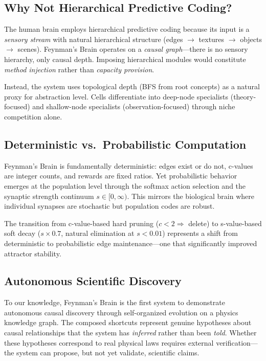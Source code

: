 \documentclass[aps,prl,reprint]{revtex4-2}
\begin{document}
\subsection{Why Not Hierarchical Predictive Coding?}

The human brain employs hierarchical predictive coding because its input is a
\emph{sensory stream} with natural hierarchical structure (edges $\rightarrow$
textures $\rightarrow$ objects $\rightarrow$ scenes). Feynman's Brain operates
on a \emph{causal graph}---there is no sensory hierarchy, only causal depth.
Imposing hierarchical modules would constitute \emph{method injection} rather
than \emph{capacity provision}.

Instead, the system uses topological depth (BFS from root concepts) as a
natural proxy for abstraction level. Cells differentiate into deep-node
specialists (theory-focused) and shallow-node specialists
(observation-focused) through niche competition alone.

\subsection{Deterministic vs.\ Probabilistic Computation}

Feynman's Brain is fundamentally deterministic: edges exist or do not, c-values
are integer counts, and rewards are fixed ratios. Yet probabilistic behavior
emerges at the population level through the softmax action selection and the
synaptic strength continuum $s \in [0, \infty)$. This mirrors the biological
brain where individual synapses are stochastic but population codes are
robust.

The transition from c-value-based hard pruning ($c < 2 \Rightarrow$ delete)
to s-value-based soft decay ($s \times 0.7$, natural elimination at $s <
0.01$) represents a shift from deterministic to probabilistic edge
maintenance---one that significantly improved attractor stability.

\subsection{Autonomous Scientific Discovery}

To our knowledge, Feynman's Brain is the first system to demonstrate
autonomous causal discovery through self-organized evolution on a physics
knowledge graph. The composed shortcuts represent genuine hypotheses about
causal relationships that the system has \emph{inferred} rather than been
\emph{told}. Whether these hypotheses correspond to real physical laws
requires external verification---the system can propose, but not yet validate,
scientific claims.
\end{document}
